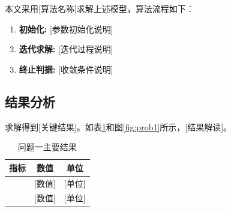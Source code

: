 本文采用[算法名称]求解上述模型，算法流程如下：

\begin{enumerate}
    \item \textbf{初始化:} [参数初始化说明]
    \item \textbf{迭代求解:} [迭代过程说明]
    \item \textbf{终止判据:} [收敛条件说明]
\end{enumerate}

\subsection{结果分析}

求解得到[关键结果]。如表\ref{tab:prob1_result}和图\ref{fig:prob1}所示，[结果解读]。

\begin{table}[H]
    \centering
    \caption{问题一主要结果}
    \label{tab:prob1_result}
    \begin{tabular}{ccc}
        \toprule
        \textbf{指标} & \textbf{数值} & \textbf{单位} \\
        \midrule
        [指标1] & [数值] & [单位] \\
        [指标2] & [数值] & [单位] \\
        \bottomrule
    \end{tabular}
\end{table}
